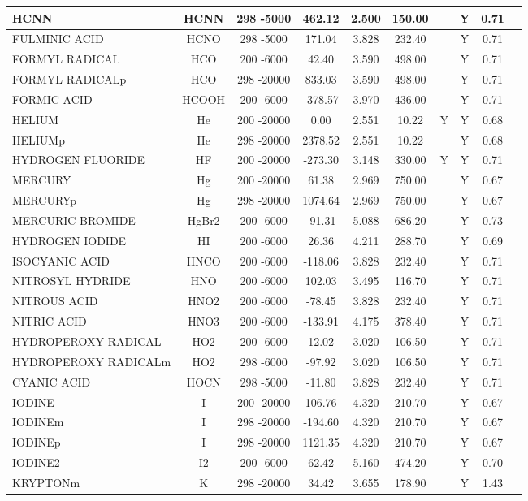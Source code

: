 \begin{longtable}{@{\extracolsep{\fill}}|l|c|c|c|c|c|c|c|c|l|}
HCNN&HCNN&298 -5000&  462.12& 2.500&   150.00& &Y& 0.71&\\ \hline
FULMINIC ACID&HCNO&298 -5000&  171.04& 3.828&   232.40& &Y& 0.71&\\ \hline
FORMYL RADICAL&HCO&200 -6000&   42.40& 3.590&   498.00& &Y& 0.71&\\ \hline
FORMYL RADICALp&HCO&298 -20000&  833.03& 3.590&   498.00& &Y& 0.71&\\ \hline
FORMIC ACID&HCOOH&200 -6000& -378.57& 3.970&   436.00& &Y& 0.71&\\ \hline
HELIUM&He&200 -20000&    0.00& 2.551&    10.22&Y&Y& 0.68&\\ \hline
HELIUMp&He&298 -20000& 2378.52& 2.551&    10.22& &Y& 0.68&\\ \hline
HYDROGEN FLUORIDE&HF&200 -20000& -273.30& 3.148&   330.00&Y&Y& 0.71&\\ \hline
MERCURY&Hg&200 -20000&   61.38& 2.969&   750.00& &Y& 0.67&\\ \hline
MERCURYp&Hg&298 -20000& 1074.64& 2.969&   750.00& &Y& 0.67&\\ \hline
MERCURIC BROMIDE&HgBr2&200 -6000&  -91.31& 5.088&   686.20& &Y& 0.73&\\ \hline
HYDROGEN IODIDE&HI&200 -6000&   26.36& 4.211&   288.70& &Y& 0.69&\\ \hline
ISOCYANIC ACID&HNCO&200 -6000& -118.06& 3.828&   232.40& &Y& 0.71&\\ \hline
NITROSYL HYDRIDE&HNO&200 -6000&  102.03& 3.495&   116.70& &Y& 0.71&\\ \hline
NITROUS ACID&HNO2&200 -6000&  -78.45& 3.828&   232.40& &Y& 0.71&\\ \hline
NITRIC ACID&HNO3&200 -6000& -133.91& 4.175&   378.40& &Y& 0.71&\\ \hline
HYDROPEROXY RADICAL&HO2&200 -6000&   12.02& 3.020&   106.50& &Y& 0.71&\\ \hline
HYDROPEROXY RADICALm&HO2&298 -6000&  -97.92& 3.020&   106.50& &Y& 0.71&\\ \hline
CYANIC ACID&HOCN&298 -5000&  -11.80& 3.828&   232.40& &Y& 0.71&\\ \hline
IODINE&I&200 -20000&  106.76& 4.320&   210.70& &Y& 0.67&\\ \hline
IODINEm&I&298 -20000& -194.60& 4.320&   210.70& &Y& 0.67&\\ \hline
IODINEp&I&298 -20000& 1121.35& 4.320&   210.70& &Y& 0.67&\\ \hline
IODINE2&I2&200 -6000&   62.42& 5.160&   474.20& &Y& 0.70&\\ \hline
KRYPTONm&K&298 -20000&   34.42& 3.655&   178.90& &Y& 1.43&\\ \hline

\end{longtable}
